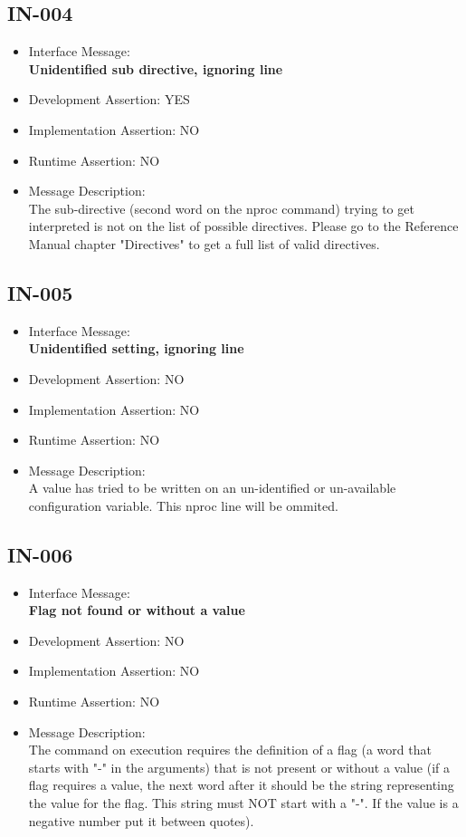 \subsection{IN-004}
\begin{itemize}
  \item Interface Message:\\[1em]
    \textbf{Unidentified sub directive, ignoring line}
  \item Development Assertion: YES
  \item Implementation Assertion: NO
  \item Runtime Assertion: NO
  \item Message Description:\\[1em]
    The sub-directive (second word on the nproc command)  trying to get interpreted is not on the list of possible directives. Please go to the Reference Manual chapter "Directives" to get a full list of valid directives.
\end{itemize}

\subsection{IN-005}
\begin{itemize}
  \item Interface Message:\\[1em]
    \textbf{Unidentified setting, ignoring line}
  \item Development Assertion: NO
  \item Implementation Assertion: NO
  \item Runtime Assertion: NO
  \item Message Description:\\[1em]
    A value has tried to be written on an un-identified or un-available configuration variable. This nproc line will be ommited.
\end{itemize}

\subsection{IN-006}
\begin{itemize}
  \item Interface Message:\\[1em]
    \textbf{Flag not found or without a value}
  \item Development Assertion: NO
  \item Implementation Assertion: NO
  \item Runtime Assertion: NO
  \item Message Description:\\[1em]
    The command on execution requires the definition of a flag (a word that starts with "-" in the arguments) that is not present or without a value (if a flag requires a value, the next word after it should be the string representing the value for the flag. This string must NOT start with a "-". If the value is a negative number put it between quotes).
\end{itemize}

